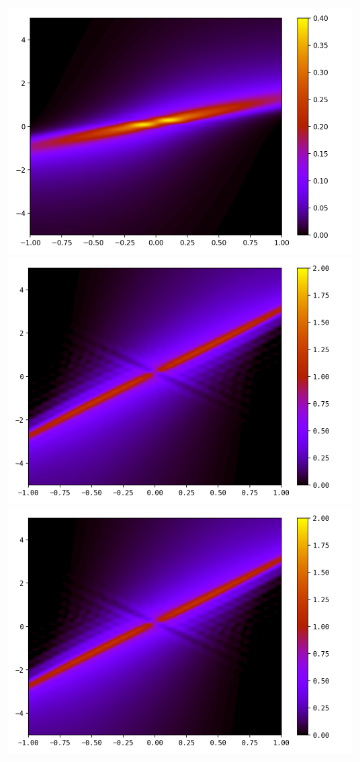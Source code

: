 \documentclass{article}
\numberwithin{equation}{section}
\newcommand{\imh}{\textheight} %
\newcommand{\imw}{\textwidth} %
\begin{document}
\begin{figure}
	\begin{subfigure}{\textwidth}
		\centering
		\includegraphics[height=\imh,width=\imw]{images/fiT20_FD.png}
		\includegraphics[height=\imh,width=\imw]{images/fiT20_512.png}
		\includegraphics[height=\imh,width=\imw]{images/fiT20_512_3.png}

\end{subfigure}
\end{figure}
\end{document}
